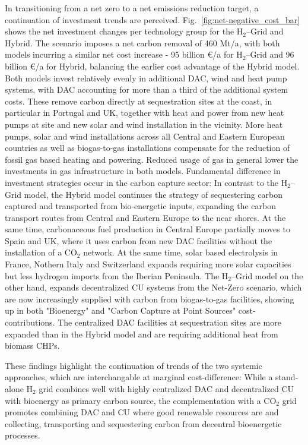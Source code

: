 \documentclass[twocolumn]{article}
\newcommand{\carbon}{CO$_2$}
\newcommand{\hydrogen}{H$_2$}
\newcommand{\hydrogengrid}{\hydrogen{}--Grid}
\begin{document}
In transitioning from a net zero to a net emissions reduction target, a continuation of investment trends are perceived. Fig.~\ref{fig:net-negative_cost_bar} shows the net investment changes per technology group for the \hydrogengrid{} and Hybrid. The scenario imposes a net carbon removal of 460 Mt/a, with both models incurring a similar net cost increase - 95 billion €/a for \hydrogengrid{} and 96 billion €/a for Hybrid, balancing the earlier cost advantage of the Hybrid model. Both models invest relatively evenly in additional DAC, wind and heat pump systems, with DAC accounting for more than a third of the additional system costs. These remove carbon directly at sequestration sites at the coast, in particular in Portugal and UK, together with heat and power from new heat pumps at site and new solar and wind installation in the vicinity.
More heat pumps, solar and wind installations across all Central and Eastern European countries as well as biogas-to-gas installations compensate for the reduction of fossil gas based heating and powering. Reduced usage of gas in general lower the investments in gas infrastructure in both models.
Fundamental difference in investment strategies occur in the carbon capture sector: In contrast to the \hydrogengrid{} model, the Hybrid model continues the strategy of sequestering carbon captured and transported from bio-energetic inputs, expanding the carbon transport routes from Central and Eastern Europe to the near shores. At the same time, carbonaceous fuel production in Central Europe partially moves to Spain and UK, where it uses carbon from new DAC facilities without the installation of a \carbon{} network. At the same time, solar based electrolysis in France, Nothern Italy and Switzerland expands requiring more solar capacities but less hydrogen imports from the Iberian Peninsula.
The \hydrogengrid{} model on the other hand, expands decentralized CU systems from the Net-Zero scenario, which are now increasingly supplied with carbon from biogas-to-gas facilities, showing up in both "Bioenergy" and "Carbon Capture at Point Sources" cost-contributions. The centralized DAC facilities at sequestration sites are more expanded than in the Hybrid model and are requiring additional heat from biomass CHPs.


These findings highlight the continuation of trends of the two systemic approaches, which are interchangable at marginal cost-difference: While a stand-alone \hydrogen{} grid combines well with highly centralized DAC and decentralized CU with bioenergy as primary carbon source, the complementation with a \carbon{} grid promotes combining DAC and CU where good renewable resources are and collecting, transporting and sequestering carbon from decentral bioenergetic processes.
\end{document}

